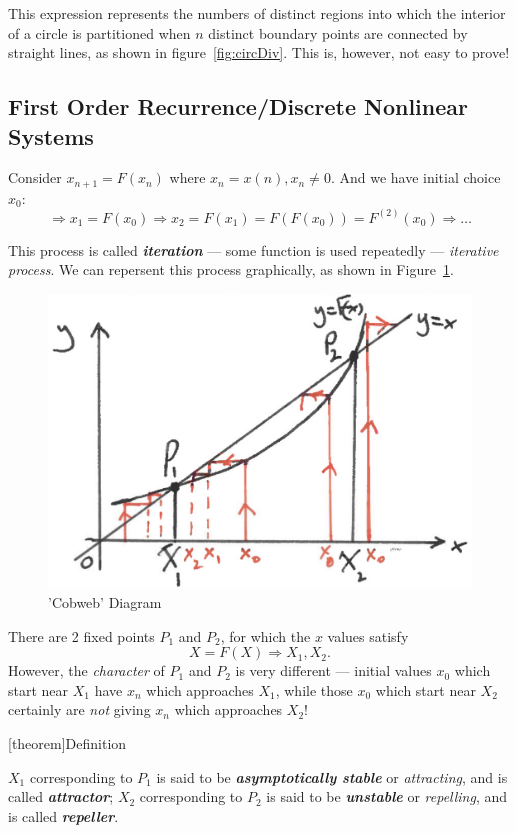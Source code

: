 \documentclass[12pt]{report}
\theoremstyle{definition}
\begin{document}
This expression represents the numbers of distinct regions into which the interior of a circle
is partitioned when $n$ distinct boundary points are connected by straight lines, as shown in figure~\ref{fig:circDiv}.
This is, however, not easy to prove!


\subsection{First Order Recurrence/Discrete Nonlinear Systems}

Consider $x_{n + 1} = F(x_n)$ where $x_n = x(n), x_n \neq 0$.
And we have initial choice $x_0$: \[
    \Rightarrow{} x_1 = F(x_0)
    \Rightarrow{} x_2 = F(x_1) = F(F(x_0)) = F^{(2)}(x_0) \Rightarrow{} \ldots
\]

This process is called \textbf{\emph{iteration}} ---
some function is used repeatedly --- \emph{iterative process}.
We can repersent this process graphically, as shown in Figure~\ref{fig:cobweb}.

\begin{figure}
  	\includegraphics[scale=0.15]{CobwebDiagram.jpg}
  	\centering
    \caption{'Cobweb' Diagram}\label{fig:cobweb}
\end{figure}

There are 2 fixed points $P_1$ and $P_2$, for which the $x$ values satisfy\[
    X = F(X) \Rightarrow{} X_1, X_2.
\]
However, the \emph{character} of $P_1$ and $P_2$ is very different ---
initial values $x_0$ which start near $X_1$ have $x_n$ which approaches $X_1$,
while those $x_0$ which start near $X_2$ certainly are \emph{not} giving $x_n$
which approaches $X_2$!

[theorem]{Definition}
\begin{attractor and repeller}
    $X_1$ corresponding to $P_1$ is said to be \textbf{\emph{asymptotically stable}} or \emph{attracting},
    and is called \textbf{\emph{attractor}};
    $X_2$ corresponding to $P_2$ is said to be \textbf{\emph{unstable}} or \emph{repelling},
    and is called \textbf{\emph{repeller}}.
\end{attractor and repeller}
\end{document}
